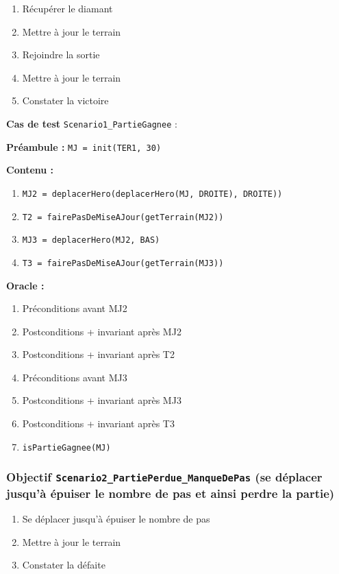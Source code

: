 \documentclass{article}
\newcommand{\cmd}[1]{\texttt{#1}}
\newcommand{\obj}[2]{\subsubsection*{\large{\textbf{Objectif {\cmd{#1} (#2)}}}}}
\newenvironment{cas}[1]
{
	\hspace{1em}\textbf{Cas de test} \cmd{#1} :
	\begin{list}{}{}
}{
	\end{list}\vspace{1em}
}
\newcommand{\pre}[1]{\item \textbf{Préambule :} \cmd{#1}}
\newcommand{\oram}{\item \textbf{Oracle :}}
\newcommand{\opem}{\item \textbf{Contenu :}}
\begin{document}
	\begin{enumerate}
		\item Récupérer le diamant
		\item Mettre à jour le terrain
		\item Rejoindre la sortie
		\item Mettre à jour le terrain
		\item Constater la victoire
	\end{enumerate}

	\begin{cas} {Scenario1\_PartieGagnee}
		\pre{MJ = init(TER1, 30)}
		\opem{}
		\begin{enumerate}
			\item \cmd{MJ2 = deplacerHero(deplacerHero(MJ, DROITE), DROITE))}
			\item \cmd{T2 = fairePasDeMiseAJour(getTerrain(MJ2))}
			\item \cmd{MJ3 = deplacerHero(MJ2, BAS)}
			\item \cmd{T3 = fairePasDeMiseAJour(getTerrain(MJ3))}
		\end{enumerate}
		\oram{}
		\begin{enumerate}
			\item Préconditions avant MJ2
			\item Postconditions + invariant après MJ2
			\item Postconditions + invariant après T2
			\item Préconditions avant MJ3
			\item Postconditions + invariant après MJ3
			\item Postconditions + invariant après T3
			\item \cmd{isPartieGagnee(MJ)}
		\end{enumerate}
	\end{cas}



\obj{Scenario2\_PartiePerdue\_ManqueDePas} {se déplacer jusqu'à épuiser le nombre de pas et ainsi perdre la partie}

	\begin{enumerate}
		\item Se déplacer jusqu'à épuiser le nombre de pas
		\item Mettre à jour le terrain
		\item Constater la défaite
	\end{enumerate}
\end{document}
